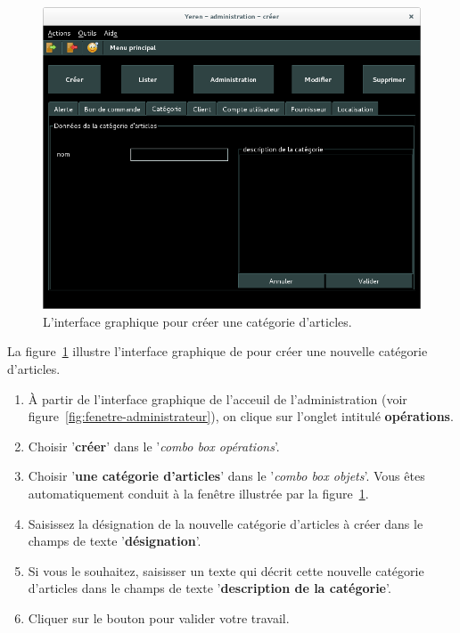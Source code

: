 
\newpage
{}

\begin{figure}[!htpb]
	\centering
	\includegraphics[scale=0.45]{images/categorie-articles-creer.png}
	\caption{L'interface graphique pour cr\'eer une cat\'egorie d'articles.}
	\label{fig:admin-categories-articles-creer}
\end{figure}

La figure~\ref{fig:admin-categories-articles-creer} illustre
l'interface graphique de \yeren pour cr\'eer une nouvelle
cat\'egorie d'articles.

\begin{enumerate}[1)]
	\item \`A partir de l'interface graphique de l'acceuil de
		l'administration (voir figure~\ref{fig:fenetre-administrateur}),
		on clique sur l'onglet intitul\'e \textbf{op\'erations}. 
		
	\item Choisir '\textbf{cr\'eer}' dans le '\emph{combo box
		op\'erations}'.
		
	\item Choisir '\textbf{une cat\'egorie d'articles}' dans
		le '\emph{combo box objets}'. Vous \^etes automatiquement
		conduit \`a la fen\^etre illustr\'ee par la
		figure~\ref{fig:admin-categories-articles-creer}.
		
	\item Saisissez la d\'esignation de la nouvelle cat\'egorie
		d'articles \`a cr\'eer dans le champs de texte
		'\textbf{d\'esignation}'.

	\item Si vous le souhaitez, saisisser un texte qui d\'ecrit
		cette nouvelle cat\'egorie d'articles dans le champs de
		texte '\textbf{description de la cat\'egorie}'.
		
	\item Cliquer sur le bouton  pour
		valider votre travail.		
\end{enumerate}

